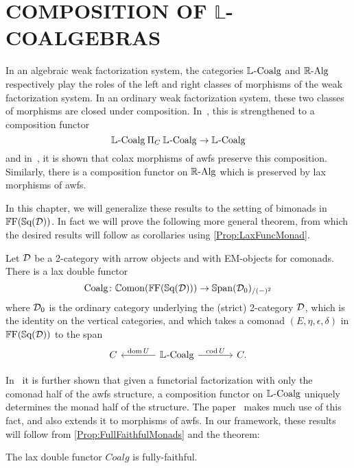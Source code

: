 
\chapter{COMPOSITION OF $\mathbb{L}$-COALGEBRAS}\label{Ch:Composition}

In an algebraic weak factorization system, the categories $\mathbb{L}_{}\text{-}\mathrm{Coalg}$ and $\mathbb{R}\text{-}\mathrm{Alg}$ respectively play the roles of the left and right classes of morphisms of the weak factorization system. In an ordinary weak factorization system, these two classes of morphisms are closed under composition. In~\cite{garner:soa}, this is strengthened to a composition functor
\[
	\mathbb{L}_{}\text{-}\mathrm{Coalg} \mathbin{\Pi}_C \mathbb{L}_{}\text{-}\mathrm{Coalg} \to \mathbb{L}_{}\text{-}\mathrm{Coalg}
\]
and in~\cite{riehl:nwfs-model}, it is shown that colax morphisms of awfs preserve this composition. Similarly, there is a composition functor on $\mathbb{R}\text{-}\mathrm{Alg}$ which is preserved by lax morphisms of awfs.

In this chapter, we will generalize these results to the setting of bimonads in $\mathbb{F}\mathrm{F}(\mathbb{S}\mathrm{q}(\mathcal{D}))$. In fact we will prove the following more general theorem, from which the desired results will follow as corollaries using \cref{Prop:LaxFuncMonad}.

\begin{theorem}\label{Thm:CoalgLaxFunctor}
	Let $\mathcal{D}$ be a 2-category with arrow objects and with EM-objects for comonads.
	There is a lax double functor
	\[
		\mathrm{Coalg}\colon \mathbb{C}\mathrm{omon}(\mathbb{F}\mathrm{F}(\mathbb{S}\mathrm{q}(\mathcal{D}))) \to \mathbb{S}\mathrm{pan}(\mathcal{D}_0)_{/(-)^2}
	\] 
	where $\mathcal{D}_0$ is the ordinary category underlying the (strict) 2-category $\mathcal{D}$, which is the identity on the vertical categories, and which takes a comonad $(E,\eta,\epsilon,\delta)$ in $\mathbb{F}\mathrm{F}(\mathbb{S}\mathrm{q}(\mathcal{D}))$ to the span
	\[
	\begin{tikzcd}[column sep=large]
		C & \LCoalg \lar[swap]{\dom U} \rar{\cod U} & C.
	\end{tikzcd}
	\]
\end{theorem}

In~\cite{garner:soa} it is further shown that given a functorial factorization with only the comonad half of the awfs structure, a composition functor on $\mathbb{L}_{}\text{-}\mathrm{Coalg}$ uniquely determines the monad half of the structure. The paper~\cite{riehl:nwfs-model} makes much use of this fact, and also extends it to morphisms of awfs. In our framework, these results will follow from \cref{Prop:FullFaithfulMonads} and the theorem:

\begin{theorem}\label{Thm:CoalgFullFaithful}
	The lax double functor $Coalg$ is fully-faithful.
\end{theorem}

